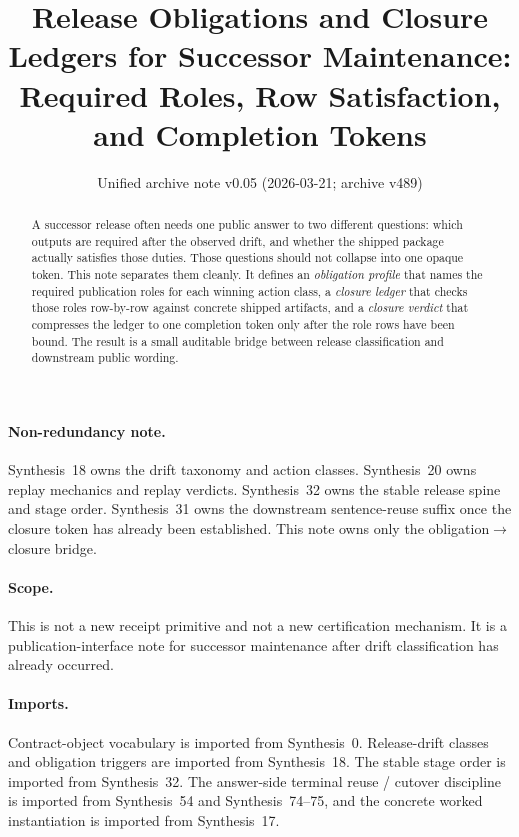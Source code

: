 \documentclass[11pt]{article}
\title{Release Obligations and Closure Ledgers for Successor Maintenance:\\[0.5ex]
\large Required Roles, Row Satisfaction, and Completion Tokens}
\author{}
\date{Unified archive note v0.05 (2026-03-21; archive v489)}
\begin{document}
\maketitle

\begin{abstract}
A successor release often needs one public answer to two different questions: which outputs are required after the observed drift, and whether the shipped package actually satisfies those duties.
Those questions should not collapse into one opaque token.
This note separates them cleanly.
It defines an \emph{obligation profile} that names the required publication roles for each winning action class, a \emph{closure ledger} that checks those roles row-by-row against concrete shipped artifacts, and a \emph{closure verdict} that compresses the ledger to one completion token only after the role rows have been bound.
The result is a small auditable bridge between release classification and downstream public wording.
\end{abstract}

\paragraph{Non-redundancy note.}
Synthesis~18 owns the drift taxonomy and action classes.\cite{series:planstateequiv}
Synthesis~20 owns replay mechanics and replay verdicts.\cite{series:auditorreplay}
Synthesis~32 owns the stable release spine and stage order.\cite{series:releasespine}
Synthesis~31 owns the downstream sentence-reuse suffix once the closure token has already been established.\cite{series:downstreamnormalforms}
This note owns only the obligation$\to$closure bridge.

\paragraph{Scope.}
This is not a new receipt primitive and not a new certification mechanism.
It is a publication-interface note for successor maintenance after drift classification has already occurred.

\paragraph{Imports.}
Contract-object vocabulary is imported from Synthesis~0.\cite{series:contractobjects}
Release-drift classes and obligation triggers are imported from Synthesis~18.\cite{series:planstateequiv}
The stable stage order is imported from Synthesis~32.\cite{series:releasespine}
The answer-side terminal reuse / cutover discipline is imported from Synthesis~54 and Synthesis~74--75, and the concrete worked instantiation is imported from Synthesis~17.\cite{series:challengeanswerreviewmenus,series:pairedterminalcitationdiscipline,series:pairedterminalcutoverrules,series:workedexample}
\end{document}
